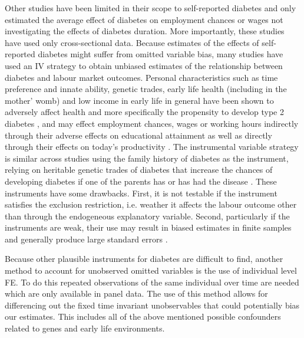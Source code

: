 Other studies have been limited in their scope to self-reported diabetes
and only estimated the average effect of diabetes on employment chances
or wages not investigating the effects of diabetes duration. More importantly,
these studies have used only cross-sectional data. Because estimates of the effects of self-reported
diabetes might suffer from omitted variable bias, many studies have
used an \ac{IV} strategy to obtain unbiased estimates of the relationship
between diabetes and labour market outcomes. Personal characteristics such as time preference
and innate ability, genetic trades, early life health (including
in the mother' womb) and low income in early life in general have been shown to
adversely affect health and more specifically the propensity to develop
type 2 diabetes \citep{VanEwijk2011a,Sotomayor2013,Li2010b}, and
may effect employment chances, wages or working hours indirectly
through their adverse effects on educational attainment \citep{Ayyagari2011b}
as well as directly through their effects on today's productivity
\citep{Currie2013}. The instrumental variable strategy is similar across studies using the family
history of diabetes as the instrument, relying on heritable genetic
trades of diabetes that increase the chances of developing diabetes
if one of the parents has or has had the disease \citep{Brown2005,Latif2009,Minor2010a,Lin2011b,Seuring2015}.
These instruments have some drawbacks. First, it
is not testable if the instrument satisfies the exclusion restriction, i.e. weather it affects the labour outcome other than through the endogeneous explanatory variable. Second, particularly if the instruments are weak, their use may result in biased estimates in finite samples and generally produce
large standard errors \citep{Bound1995}. 

Because other plausible instruments for diabetes are difficult to
find, another method to account for unobserved omitted variables is
the use of individual level \ac{FE}. To do this repeated observations
of the same individual over time are needed which are only available
in panel data. The use of this method allows for differencing out
the fixed time invariant unobservables that could potentially bias
our estimates. This includes all of the above mentioned possible confounders
related to genes and early life environments.

